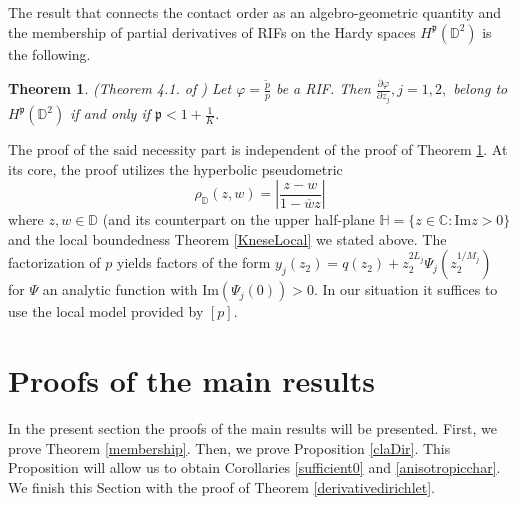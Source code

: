 \documentclass[11pt]{amsart}
\newtheorem{theorem}{Theorem}[section]
\numberwithin{equation}{section}
\begin{document}
The result that connects the contact order as an algebro-geometric quantity and the membership of partial derivatives of RIFs on the Hardy spaces $H^\mathfrak{p}(\mathbb{D}^2)$ is the following.

\begin{theorem} (Theorem 4.1. of \cite{PLMS}) 
Let $\varphi=\frac{\widetilde{p}}{p}$ be a RIF. Then $\frac{\partial\varphi}{\partial z_j}, j=1,2,$ belong to $H^\mathfrak{p}(\mathbb{D}^2)$ if and only if $\mathfrak{p}<1+\frac{1}{K}.$
\label{HardyMembership}
\end{theorem}
The proof of the said necessity part is independent of the proof of Theorem \ref{HardyMembership}. At its core, the proof utilizes the hyperbolic pseudometric $$\rho_{\mathbb{D}}(z,w)=\left|\frac{z-w}{1-\overline{w}z}\right|$$ where $z,w\in\mathbb{D}$ (and its counterpart on the upper half-plane $\mathbb{H}=\{z\in \mathbb{C}:\mathrm{Im}z>0\}$ and the local boundedness Theorem \ref{KneseLocal} we stated above.
The factorization of $p$ yields factors of the form $y_j(z_2)=q(z_2)+z_2^{2L_j}\Psi_j(z_2^{1/M_j})$ for $\Psi$ an analytic function with $\mathrm{Im}(\Psi_j(0))>0.$ In our situation it suffices to use the local model provided by $[p]$.
\section{Proofs of the main results} \label{section 4} In the present section the proofs of the main results will be presented.  First, we prove Theorem \ref{membership}. Then, we prove Proposition \ref{claDir}. This Proposition will allow us to obtain Corollaries \ref{sufficient0} and \ref{anisotropicchar}. We finish this Section with the proof of Theorem \ref{derivativedirichlet}.
\end{document}
